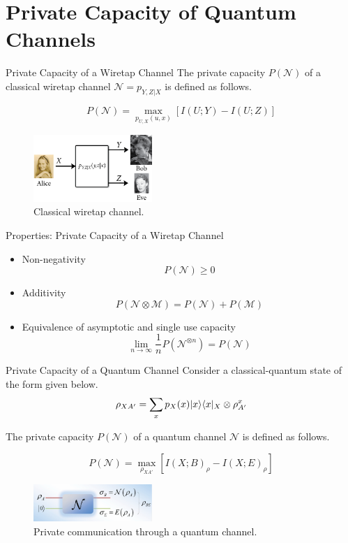 \section{Private Capacity of Quantum Channels}

\begin{frame}{Private Capacity of a Wiretap Channel}
The private capacity $P(\mathcal{N})$ of a classical wiretap channel $\mathcal{N} = p_{Y,Z|X}$ is defined as follows.
\begin{tcolorbox}
$$P(\mathcal{N}) = \max_{p_{U,X}(u,x)} \left[ I(U;Y) - I(U;Z) \right]$$
\end{tcolorbox}

\begin{figure}
    \includegraphics[width=0.4\textwidth]{figures/private_communication_wiretap_channel.png}
    \caption{Classical wiretap channel.}
\end{figure}
\end{frame}

\begin{frame}{Properties: Private Capacity of a Wiretap Channel}
\begin{itemize}
    \setlength{\itemsep}{1.5em}
    \item Non-negativity
    $$P(\mathcal{N}) \geq 0$$
    \item Additivity
    $$P(\mathcal{N} \otimes \mathcal{M}) = P(\mathcal{N}) + P(\mathcal{M})$$
    \item Equivalence of asymptotic and single use capacity
    $$\lim_{n \rightarrow \infty} \frac{1}{n} P(\mathcal{N}^{\otimes n}) = P(\mathcal{N})$$
\end{itemize}
\end{frame}

\begin{frame}{Private Capacity of a Quantum Channel}
Consider a classical-quantum state of the form given below.
$$\rho_{XA'} = \sum_{x} p_X(x) \lvert x\rangle\langle x\rvert_X \otimes \rho_{A'}^x $$

The private capacity $P(\mathcal{N})$ of a quantum channel $\mathcal{N}$ is defined as follows.
\begin{tcolorbox}
$$P(\mathcal{N}) = \max_{\rho_{XA'}} \left[ I(X;B)_\rho - I(X;E)_\rho \right]$$
\end{tcolorbox}

\begin{figure}
    \includegraphics[width=0.4\textwidth]{figures/private_communication_quantum_channel.png}
    \caption{Private communication through a quantum channel.}
\end{figure}
\end{frame}

